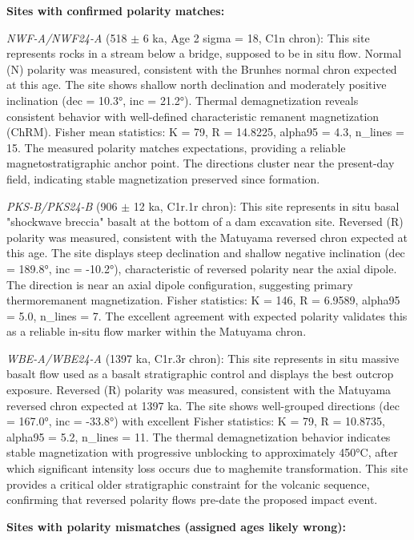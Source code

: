 \documentclass[twocolumn,11pt]{article}
\begin{document}
\textbf{Sites with confirmed polarity matches:}

\textit{NWF-A/NWF24-A} (518 $\pm$ 6 ka, Age 2 sigma = 18, C1n chron): This site represents rocks in a stream below a bridge, supposed to be in situ flow. Normal (N) polarity was measured, consistent with the Brunhes normal chron expected at this age. The site shows shallow north declination and moderately positive inclination (dec = 10.3°, inc = 21.2°). Thermal demagnetization reveals consistent behavior with well-defined characteristic remanent magnetization (ChRM). Fisher mean statistics: K = 79, R = 14.8225, alpha95 = 4.3, n\_lines = 15. The measured polarity matches expectations, providing a reliable magnetostratigraphic anchor point. The directions cluster near the present-day field, indicating stable magnetization preserved since formation.

\textit{PKS-B/PKS24-B} (906 $\pm$ 12 ka, C1r.1r chron): This site represents in situ basal "shockwave breccia" basalt at the bottom of a dam excavation site. Reversed (R) polarity was measured, consistent with the Matuyama reversed chron expected at this age. The site displays steep declination and shallow negative inclination (dec = 189.8°, inc = -10.2°), characteristic of reversed polarity near the axial dipole. The direction is near an axial dipole configuration, suggesting primary thermoremanent magnetization. Fisher statistics: K = 146, R = 6.9589, alpha95 = 5.0, n\_lines = 7. The excellent agreement with expected polarity validates this as a reliable in-situ flow marker within the Matuyama chron.

\textit{WBE-A/WBE24-A} (1397 ka, C1r.3r chron): This site represents in situ massive basalt flow used as a basalt stratigraphic control and displays the best outcrop exposure. Reversed (R) polarity was measured, consistent with the Matuyama reversed chron expected at 1397 ka. The site shows well-grouped directions (dec = 167.0°, inc = -33.8°) with excellent Fisher statistics: K = 79, R = 10.8735, alpha95 = 5.2, n\_lines = 11. The thermal demagnetization behavior indicates stable magnetization with progressive unblocking to approximately 450°C, after which significant intensity loss occurs due to maghemite transformation. This site provides a critical older stratigraphic constraint for the volcanic sequence, confirming that reversed polarity flows pre-date the proposed impact event.

\textbf{Sites with polarity mismatches (assigned ages likely wrong):}
\end{document}
